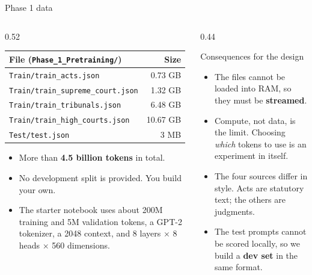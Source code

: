 \documentclass[aspectratio=169,11pt]{beamer}
\newcommand{\code}[1]{\texttt{\small #1}}
\begin{document}
\begin{frame}{Phase 1 data}
  \begin{columns}[T]
    \begin{column}{0.52\textwidth}
      \small
      \begin{tabular}{@{}lr@{}}
        \toprule
        File (\code{Phase\_1\_Pretraining/}) & Size\\
        \midrule
        \code{Train/train\_acts.json} & 0.73 GB\\
        \code{Train/train\_supreme\_court.json} & 1.32 GB\\
        \code{Train/train\_tribunals.json} & 6.48 GB\\
        \code{Train/train\_high\_courts.json} & 10.67 GB\\
        \code{Test/test.json} & 3 MB\\
        \bottomrule
      \end{tabular}
      \vspace{2mm}
      \begin{itemize}
        \item More than \textbf{4.5 billion tokens} in total.
        \item No development split is provided. \alert{You build your own.}
        \item The starter notebook uses about 200M training and 5M validation tokens, a GPT-2 tokenizer, a 2048 context, and 8 layers $\times$ 8 heads $\times$ 560 dimensions.
      \end{itemize}
    \end{column}
    \begin{column}{0.44\textwidth}
      \begin{block}{Consequences for the design}
        \small
        \begin{itemize}
          \item The files cannot be loaded into RAM, so they must be \textbf{streamed}.
          \item Compute, not data, is the limit. Choosing \emph{which} tokens to use is an experiment in itself.
          \item The four sources differ in style. Acts are statutory text; the others are judgments.
          \item The test prompts cannot be scored locally, so we build a \textbf{dev set} in the same format.
        \end{itemize}
      \end{block}
    \end{column}
  \end{columns}
\end{frame}
\end{document}
